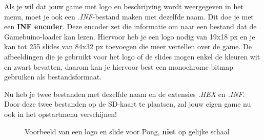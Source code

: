 \documentclass[a4paper,titlepage,12pt]{article}
\begin{document}
	Als je wil dat jouw game met logo en beschrijving wordt weergegeven in het menu, moet je ook een \emph{.INF}-bestand maken met dezelfde naam. Dit doe je met een \textbf{INF encoder}\cite{GitHub:Rodot:InfEncoder}. Deze encoder zet die informatie om naar een bestand dat de Gamebuino-loader kan lezen. Hiervoor heb je een logo nodig van 19x18 px en je kan tot 255 slides van 84x32 px toevoegen die meer vertellen over de game. De afbeeldingen die je gebruikt voor het logo of de slides mogen enkel de kleuren wit en zwart bevatten, daarom kan je hiervoor best een monochrome bitmap gebruiken als bestandsformaat.
	
	Nu heb je twee bestanden met dezelfde naam en de extensies \emph{.HEX} en \emph{.INF}. Door deze twee bestanden op de SD-kaart te plaatsen, zal jouw eigen game nu ook in het opstartmenu verschijnen!
	
	\begin{figure}[h]
		\centering
		\caption{\label{fig:logo_slide}Voorbeeld van een logo en slide voor Pong, \textbf{niet} op gelijke schaal}
	\end{figure}
	
	\newpage
	
	
\end{document}
